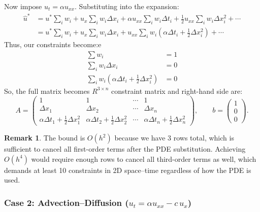 \documentclass[12pt, a4paper, twoside]{report}
\theoremstyle{plain}
\theoremstyle{definition}
\newtheorem{remark}[theorem]{Remark}
\begin{document}
Now impose $u_t = \alpha u_{xx}$.
Substituting into the expansion:
\begin{align}
    \hat{u}^* &= u^* \sum_i w_i
    + u_x    \sum_i w_i \Delta x_i
    + \alpha u_{xx} \sum_i w_i \Delta t_i
    + \tfrac{1}{2} u_{xx} \sum_i w_i \Delta x_i^2
    + \cdots \\
    &= u^* \sum_i w_i
    + u_x \sum_i w_i \Delta x_i
    + u_{xx} \sum_i w_i \!\left(\alpha \Delta t_i + \tfrac{1}{2}\Delta x_i^2\right)
    + \cdots
\end{align}
Thus, our constraints become:e
\begin{align}
    \sum w_i&=1 \label{eq:diff_row1} \\
    \sum_i w_i \Delta x_i &= 0 \label{eq:diff_row2}\\
    \sum_i w_i \!\left(\alpha \Delta t_i + \tfrac{1}{2}\Delta x_i^2\right) &= 0
    \label{eq:diff_row3}
\end{align}
So, the full matrix becomes $R^{3 \times n}$ constraint matrix and right-hand side are:
\begin{equation}
    A = \begin{pmatrix}
        1 & 1 & \cdots & 1 \\
        \Delta x_1 & \Delta x_2 & \cdots & \Delta x_n \\
        \alpha \Delta t_1 + \tfrac{1}{2}\Delta x_1^2
        & \alpha \Delta t_2 + \tfrac{1}{2}\Delta x_2^2
        & \cdots
        & \alpha \Delta t_n + \tfrac{1}{2}\Delta x_n^2
    \end{pmatrix},
    \qquad
    b = \begin{pmatrix} 1 \\ 0 \\ 0 \end{pmatrix}.
\end{equation} 
\begin{remark}
    The bound is $O(h^2)$ because we have 3 rows total, which is sufficient
    to cancel all first-order terms after the PDE substitution.
    Achieving $O(h^4)$ would require enough rows to cancel all third-order
    terms as well, which demands at least 10 constraints in 2D space--time
    regardless of how the PDE is used.
\end{remark}

\subsubsection*{Case 2: Advection--Diffusion \texorpdfstring{($u_t = \alpha u_{xx} - c\, u_x$)}{}}
\end{document}
